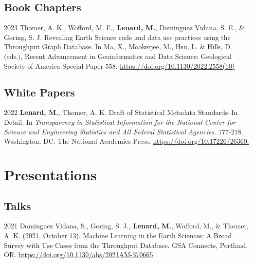 \documentclass[12pt,letterpaper]{report}
\begin{document}
\subsection*{Book Chapters}

\begin{tablist}

	\item[2023] \tab Thomer, A. K., Wofford, M. F., \textbf{Lenard, M.}, Dominguez Vidana, S. E., \& Goring, S. J. Revealing Earth Science code and data use practices using the Throughput Graph Database. In Ma, X., Mookerjee, M., Hsu, L. \& Hills, D. (eds.), Recent Advancement in Geoinformatics and Data Science: Geological Society 
of America Special Paper 558. \href{https://doi.org/10.1130/2022.2558(10)}{https://doi.org/10.1130/2022.2558(10)}
	
\end{tablist}

\subsection*{White Papers}

\begin{tablist}

	\item[2022] \tab \textbf{Lenard, M.}, Thomer, A. K. Draft of Statistical Metadata Standards--In Detail. In \textit{Transparency in Statistical Information for the National Center for Science and Engineering Statistics and All Federal Statistical Agencies.} 177-218. Washington, DC: The National Academies Press. \href{https://doi.org/10.17226/26360}{https://doi.org/10.17226/26360.}
	
\end{tablist}



\section*{Presentations}

\subsection*{Talks}

\begin{tablist}

	\item[2021] \tab Dominguez Vidana, S., Goring, S. J., \textbf{Lenard, M.}, Wofford, M., \& Thomer, A. K. (2021, October 13). Machine Learning in the Earth Sciences: A Broad Survey with Use Cases from the Throughput Database. GSA Connects, Portland, OR. \href{https://doi.org/10.1130/abs/2021AM-370665}{https://doi.org/10.1130/abs/2021AM-370665}
	    

\end{tablist}
    
\end{document}
